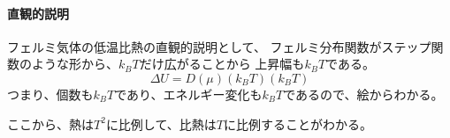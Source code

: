 \documentclass[titlepage]{ltjsarticle}
\begin{document}
\paragraph{直観的説明}
フェルミ気体の低温比熱の直観的説明として、
フェルミ分布関数がステップ関数のような形から、\(k_BT\)だけ広がることから
上昇幅も\(k_BT\)である。
\begin{equation}
  \varDelta  U = D(\mu)(k_BT)(k_BT)
\end{equation}
つまり、個数も\(k_BT\)であり、エネルギー変化も\(k_BT\)であるので、絵からわかる。

ここから、熱は\(T^2\)に比例して、比熱は\(T\)に比例することがわかる。
\end{document}
